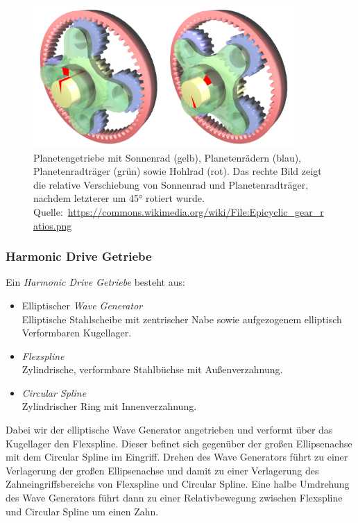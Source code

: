 				\begin{figure}
					\centering
					\includegraphics[width = 0.9\textwidth]{epicyclicgear}
					\caption{Planetengetriebe mit Sonnenrad (gelb), Planetenrädern (blau), Planetenradträger (grün) sowie Hohlrad (rot). Das rechte Bild zeigt die relative Verschiebung von Sonnenrad und Planetenradträger, nachdem letzterer um \ang{45} rotiert wurde. Quelle:~\url{https://commons.wikimedia.org/wiki/File:Epicyclic_gear_ratios.png}}
				\end{figure}

			\subsubsection{Harmonic Drive Getriebe}
				Ein \emph{Harmonic Drive Getriebe} besteht aus:
				\begin{itemize}
					\item Elliptischer \emph{Wave Generator} \\ Elliptische Stahlscheibe mit zentrischer Nabe sowie aufgezogenem elliptisch Verformbaren Kugellager.
					\item \emph{Flexspline} \\ Zylindrische, verformbare Stahlbüchse mit Außenverzahnung.
					\item \emph{Circular Spline} \\ Zylindrischer Ring mit Innenverzahnung.
				\end{itemize}
			
				Dabei wir der elliptische Wave Generator angetrieben und verformt über das Kugellager den Flexspline. Dieser befinet sich gegenüber der großen Ellipsenachse mit dem Circular Spline im Eingriff. Drehen des Wave Generators führt zu einer Verlagerung der großen Ellipsenachse und damit zu einer Verlagerung  des Zahneingriffsbereichs von Flexspline und Circular Spline. Eine halbe Umdrehung des Wave Generators führt dann zu einer Relativbewegung zwischen Flexspline und Circular Spline um einen Zahn.
				
